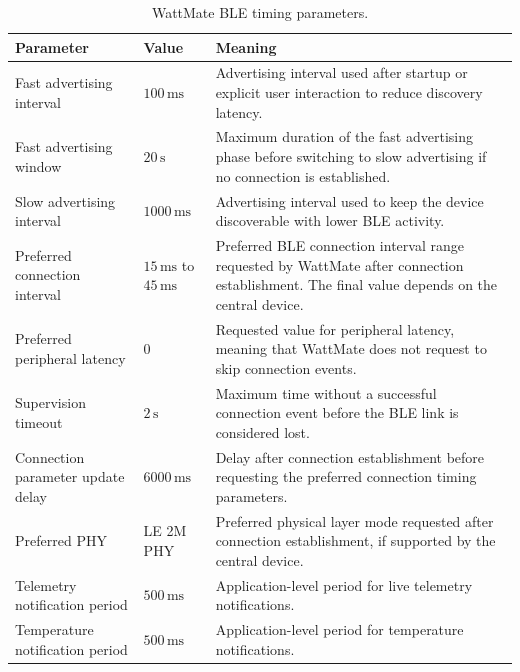 \begin{table}[H]
	\centering
	\small
	\caption{WattMate BLE timing parameters.}
	\label{tab:wattmate_ble_timing_parameters}
	\begin{tabular}{p{} p{} p{}}
		\toprule
		\textbf{Parameter} & \textbf{Value} & \textbf{Meaning} \\
		\midrule
		Fast advertising interval &
		\(100\,\mathrm{ms}\) &
		Advertising interval used after startup or explicit user interaction to reduce discovery latency. \\
		
		Fast advertising window &
		\(20\,\mathrm{s}\) &
		Maximum duration of the fast advertising phase before switching to slow advertising if no connection is established. \\
		
		Slow advertising interval &
		\(1000\,\mathrm{ms}\) &
		Advertising interval used to keep the device discoverable with lower BLE activity. \\
		
		Preferred connection interval &
		\(15\,\mathrm{ms}\) to \(45\,\mathrm{ms}\) &
		Preferred BLE connection interval range requested by WattMate after connection establishment. The final value depends on the central device. \\
		
		Preferred peripheral latency &
		\(0\) &
		Requested value for peripheral latency, meaning that WattMate does not request to skip connection events. \\
		
		Supervision timeout &
		\(2\,\mathrm{s}\) &
		Maximum time without a successful connection event before the BLE link is considered lost. \\
		
		Connection parameter update delay &
		\(6000\,\mathrm{ms}\) &
		Delay after connection establishment before requesting the preferred connection timing parameters. \\
		
		Preferred PHY &
		LE 2M PHY &
		Preferred physical layer mode requested after connection establishment, if supported by the central device. \\
		
		Telemetry notification period &
		\(500\,\mathrm{ms}\) &
		Application-level period for live telemetry notifications. \\
		
		Temperature notification period &
		\(500\,\mathrm{ms}\) &
		Application-level period for temperature notifications. \\
		

\end{tabular}
\end{table}
